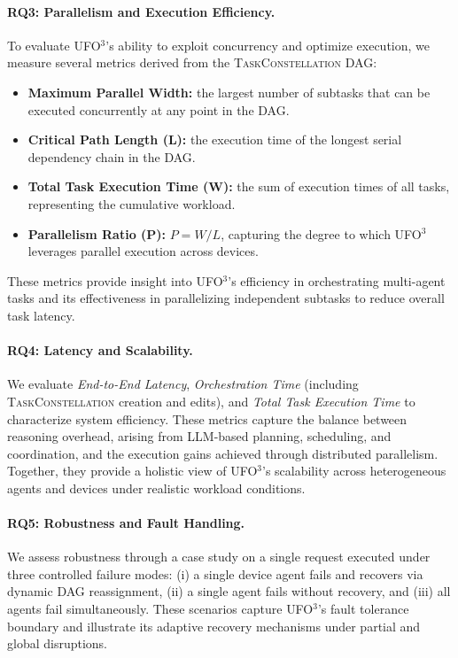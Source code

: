 \documentclass[10pt]{article} %
\newcommand{\ufo}{\textsc{UFO}$^3$\xspace}
\newcommand{\TaskConstellation}{\textsc{TaskConstellation}\xspace}
\begin{document}
\paragraph{RQ3: Parallelism and Execution Efficiency.} 
To evaluate \ufo's ability to exploit concurrency and optimize execution, we measure several metrics derived from the \TaskConstellation DAG: 
\begin{itemize}
    \item \textbf{Maximum Parallel Width:} the largest number of subtasks that can be executed concurrently at any point in the DAG.
    \item \textbf{Critical Path Length (L):} the execution time of the longest serial dependency chain in the DAG.
    \item \textbf{Total Task Execution Time (W):} the sum of execution times of all tasks, representing the cumulative workload.
    \item \textbf{Parallelism Ratio (P):} $P = W / L$, capturing the degree to which \ufo leverages parallel execution across devices.    
\end{itemize}
These metrics provide insight into \ufo's efficiency in orchestrating multi-agent tasks and its effectiveness in parallelizing independent subtasks to reduce overall task latency.

\paragraph{RQ4: Latency and Scalability.}
We evaluate \textit{End-to-End Latency}, \textit{Orchestration Time} (including \TaskConstellation creation and edits), and \textit{Total Task Execution Time} to characterize system efficiency. These metrics capture the balance between reasoning overhead, arising from LLM-based planning, scheduling, and coordination, and the execution gains achieved through distributed parallelism. Together, they provide a holistic view of \ufo's scalability across heterogeneous agents and devices under realistic workload conditions.

\paragraph{RQ5: Robustness and Fault Handling.}
We assess robustness through a case study on a single request executed under three controlled failure modes: \textsf{(i)} a single device agent fails and recovers via dynamic DAG reassignment, \textsf{(ii)} a single agent fails without recovery, and \textsf{(iii)} all agents fail simultaneously. These scenarios capture \ufo's fault tolerance boundary and illustrate its adaptive recovery mechanisms under partial and global disruptions.
\end{document}

